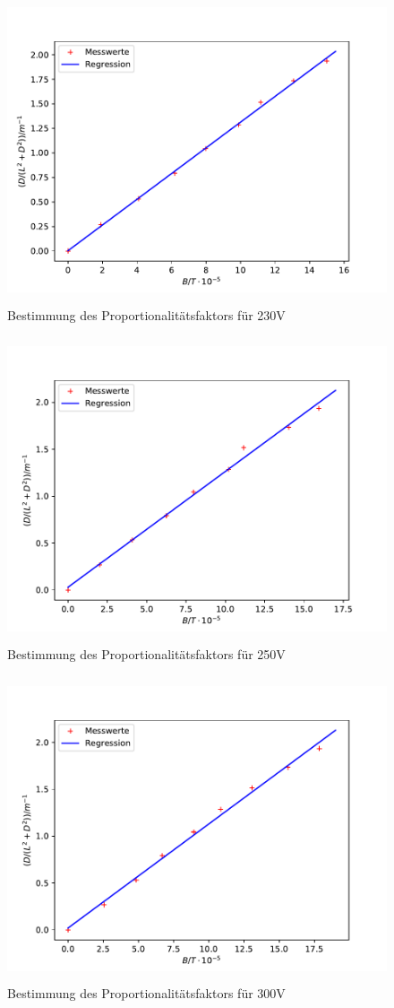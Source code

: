 \begin{figure}
\centering
\includegraphics[height=9cm]{plot230e.pdf}
\caption{Bestimmung des Proportionalitätsfaktors für 230V}
\label{fig:230e}
\end{figure}
\begin{figure}
\centering
\includegraphics[height=9cm]{plot250e.pdf}
\caption{Bestimmung des Proportionalitätsfaktors für 250V}
\label{fig:250e}
\end{figure}
\begin{figure}
\centering
\includegraphics[height=9cm]{plot300e.pdf}
\caption{Bestimmung des Proportionalitätsfaktors für 300V}
\label{fig:300e}
\end{figure}
